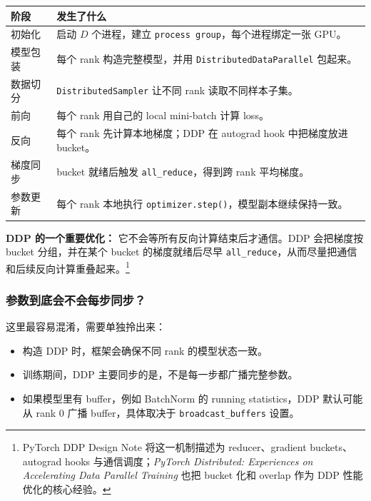 \begin{center}
{\small
\begin{tabular}{p{2.7cm}p{10.2cm}}
\hline
\textbf{阶段} & \textbf{发生了什么} \\
\hline
初始化 & 启动 $D$ 个进程，建立 \texttt{process group}，每个进程绑定一张 GPU。 \\
模型包装 & 每个 rank 构造完整模型，并用 \texttt{DistributedDataParallel} 包起来。 \\
数据切分 & \texttt{DistributedSampler} 让不同 rank 读取不同样本子集。 \\
前向 & 每个 rank 用自己的 local mini-batch 计算 loss。 \\
反向 & 每个 rank 先计算本地梯度；DDP 在 autograd hook 中把梯度放进 bucket。 \\
梯度同步 & bucket 就绪后触发 \texttt{all\_reduce}，得到跨 rank 平均梯度。 \\
参数更新 & 每个 rank 本地执行 \texttt{optimizer.step()}，模型副本继续保持一致。 \\
\hline
\end{tabular}
}
\end{center}

\begin{intubox}
\textbf{DDP 的一个重要优化：} 它不会等所有反向计算结束后才通信。DDP 会把梯度按 bucket 分组，并在某个 bucket 的梯度就绪后尽早 \texttt{all\_reduce}，从而尽量把通信和后续反向计算重叠起来。\footnote{PyTorch DDP Design Note 将这一机制描述为 reducer、gradient buckets、autograd hooks 与通信调度；\emph{PyTorch Distributed: Experiences on Accelerating Data Parallel Training} 也把 bucket 化和 overlap 作为 DDP 性能优化的核心经验。}
\end{intubox}

\subsubsection*{参数到底会不会每步同步？}

这里最容易混淆，需要单独拎出来：

\begin{itemize}[leftmargin=1.5em]
  \item 构造 DDP 时，框架会确保不同 rank 的模型状态一致。
  \item 训练期间，DDP 主要同步的是，不是每一步都广播完整参数。
  \item 如果模型里有 buffer，例如 BatchNorm 的 running statistics，DDP 默认可能从 rank 0 广播 buffer，具体取决于 \texttt{broadcast\_buffers} 设置。
\end{itemize}

